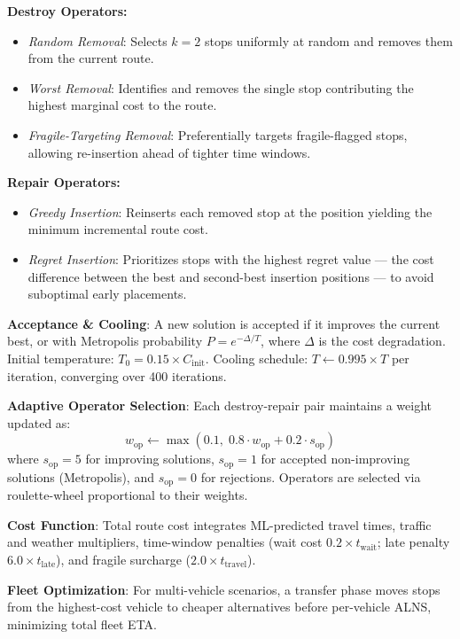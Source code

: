 \documentclass[conference]{IEEEtran}
\begin{document}
\textbf{Destroy Operators:}
\begin{itemize}
\item \textit{Random Removal}: Selects $k\!=\!2$ stops uniformly at random
  and removes them from the current route.
\item \textit{Worst Removal}: Identifies and removes the single stop
  contributing the highest marginal cost to the route.
\item \textit{Fragile-Targeting Removal}: Preferentially targets
  fragile-flagged stops, allowing re-insertion ahead of tighter time windows.
\end{itemize}

\textbf{Repair Operators:}
\begin{itemize}
\item \textit{Greedy Insertion}: Reinserts each removed stop at the position
  yielding the minimum incremental route cost.
\item \textit{Regret Insertion}: Prioritizes stops with the highest regret
  value — the cost difference between the best and second-best insertion
  positions — to avoid suboptimal early placements.
\end{itemize}

\textbf{Acceptance \& Cooling}: A new solution is accepted if it improves the
current best, or with Metropolis probability $P = e^{-\Delta / T}$, where
$\Delta$ is the cost degradation. Initial temperature:
$T_0 = 0.15 \times C_{\text{init}}$. Cooling schedule:
$T \leftarrow 0.995 \times T$ per iteration, converging over 400 iterations.

\textbf{Adaptive Operator Selection}: Each destroy-repair pair maintains a
weight updated as:
\[
  w_{\text{op}} \leftarrow \max\!\left(0.1,\;
  0.8 \cdot w_{\text{op}} + 0.2 \cdot s_{\text{op}}\right)
\]
where $s_{\text{op}} = 5$ for improving solutions, $s_{\text{op}} = 1$ for
accepted non-improving solutions (Metropolis), and $s_{\text{op}} = 0$ for
rejections. Operators are selected via roulette-wheel proportional to their weights.

\textbf{Cost Function}: Total route cost integrates ML-predicted travel times,
traffic and weather multipliers, time-window penalties (wait cost
$0.2 \times t_{\text{wait}}$; late penalty $6.0 \times t_{\text{late}}$),
and fragile surcharge ($2.0 \times t_{\text{travel}}$).

\textbf{Fleet Optimization}: For multi-vehicle scenarios, a transfer phase
moves stops from the highest-cost vehicle to cheaper alternatives before
per-vehicle ALNS, minimizing total fleet ETA.
\end{document}
